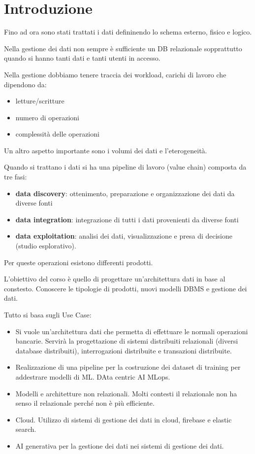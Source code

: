 \chapter{Introduzione}
Fino ad ora sono stati trattati i dati defininendo lo schema esterno, fisico e logico.

Nella gestione dei dati non sempre è sufficiente un DB relazionale sopprattutto 
quando si hanno tanti dati e tanti utenti in accesso.

Nella gestione dobbiamo tenere traccia dei workload, carichi di lavoro che dipendono da:
\begin{itemize}
    \item letture/scritture
    \item numero di operazioni
    \item complessità delle operazioni
\end{itemize}
Un altro aspetto importante sono i volumi dei dati e l'eterogeneità.

Quando si trattano i dati si ha una pipeline di lavoro (value chain) composta da tre fasi:
\begin{itemize}
    \item \textbf{data discovery}: ottenimento, preparazione e organizzazione dei dati da 
    diverse fonti
    \item \textbf{data integration}: integrazione di tutti i dati provenienti da
    diverse fonti
    \item \textbf{data exploitation}: analisi dei dati, visualizzazione e presa di decisione (studio esplorativo).
\end{itemize}
Per queste operazioni esistono
differenti prodotti.

L'obiettivo del corso è quello di progettare un'architettura dati in base al constesto.
Conoscere le tipologie di prodotti, nuovi modelli DBMS e gestione dei dati.

Tutto si basa sugli Use Case:
\begin{itemize}
    \item Si vuole un'architettura dati che permetta di effettuare le normali operazioni 
    bancarie. Servirà la progettazione di sistemi distribuiti relazionali (diversi database distribuiti), 
    interrogazioni distribuite e transazioni distribuite.
    \item Realizzazione di una pipeline per la costruzione dei dataset di training
    per addestrare modelli di ML. DAta centric AI MLops.
    \item Modelli e architetture non relazionali.  Molti contesti il relazionale 
    non ha senso il relazionale perché non è più efficiente.
    \item Cloud. Utilizzo di sistemi di gestione dei dati in cloud, firebase e elastic search.
    \item AI generativa per la gestione dei dati nei sistemi di gestione dei dati.
\end{itemize}

